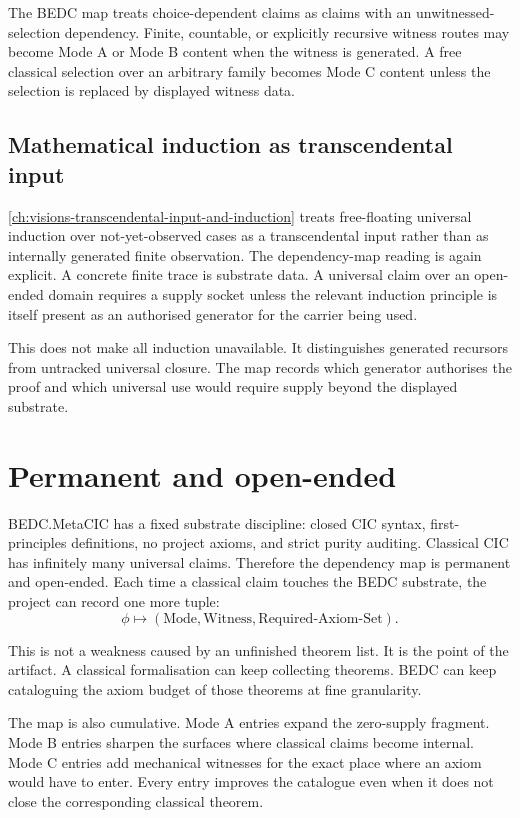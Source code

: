 The BEDC map treats choice-dependent claims as claims with an unwitnessed-selection dependency. Finite, countable, or explicitly recursive witness routes may become Mode A or Mode B content when the witness is generated. A free classical selection over an arbitrary family becomes Mode C content unless the selection is replaced by displayed witness data.

\subsection{Mathematical induction as transcendental input}
\label{subsec:bedc-axiom-dependency-map-induction}

\autoref{ch:visions-transcendental-input-and-induction} treats free-floating universal induction over not-yet-observed cases as a transcendental input rather than as internally generated finite observation. The dependency-map reading is again explicit. A concrete finite trace is substrate data. A universal claim over an open-ended domain requires a supply socket unless the relevant induction principle is itself present as an authorised generator for the carrier being used.

This does not make all induction unavailable. It distinguishes generated recursors from untracked universal closure. The map records which generator authorises the proof and which universal use would require supply beyond the displayed substrate.

\section{Permanent and open-ended}
\label{sec:bedc-axiom-dependency-map-permanent}

BEDC.MetaCIC has a fixed substrate discipline: closed CIC syntax, first-principles definitions, no project axioms, and strict purity auditing. Classical CIC has infinitely many universal claims. Therefore the dependency map is permanent and open-ended. Each time a classical claim touches the BEDC substrate, the project can record one more tuple:
$$
\phi \mapsto
(\text{Mode},\text{Witness},\text{Required-Axiom-Set}).
$$

This is not a weakness caused by an unfinished theorem list. It is the point of the artifact. A classical formalisation can keep collecting theorems. BEDC can keep cataloguing the axiom budget of those theorems at fine granularity.

The map is also cumulative. Mode A entries expand the zero-supply fragment. Mode B entries sharpen the surfaces where classical claims become internal. Mode C entries add mechanical witnesses for the exact place where an axiom would have to enter. Every entry improves the catalogue even when it does not close the corresponding classical theorem.

